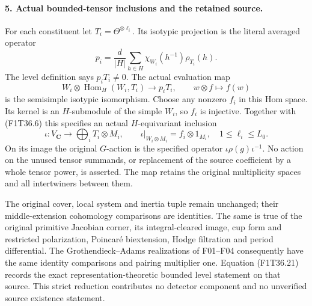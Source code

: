 \paragraph{5. Actual bounded-tensor inclusions and the retained source.}
For each constituent let
\(T_i=\Theta^{\otimes\ell_i}\).
Its isotypic projection is the literal
averaged operator
\[
 p_i=\frac d{|H|}\sum_{h\in H}
                    \chi_{W_i}(h^{-1})\rho_{T_i}(h).
 \tag{F1T36.19}
\]
The level definition says \(p_iT_i\ne0\).
The actual evaluation map
\[
 W_i\otimes\operatorname{Hom}_H(W_i,T_i)
                       \longrightarrow p_iT_i,
                    \qquad w\otimes f\longmapsto f(w)
 \tag{F1T36.20}
\]
is the semisimple isotypic isomorphism.
Choose any nonzero \(f_i\) in this Hom space.
Its kernel is an \(H\)-submodule of the
simple \(W_i\), so \(f_i\) is injective.
Together with (F1T36.6) this specifies an
actual \(H\)-equivariant inclusion
\[
 \iota:V_{\mathbf C}\longrightarrow
       \bigoplus_i T_i\otimes M_i,
 \qquad
 \iota|_{W_i\otimes M_i}=f_i\otimes1_{M_i},
 \quad 1\le\ell_i\le L_0.
 \tag{F1T36.21}
\]
On its image the original \(G\)-action is
the specified operator
\(\iota\rho(g)\iota^{-1}\). No action on
the unused tensor summands, or replacement
of the source coefficient by a whole tensor
power, is asserted. The map retains the
original multiplicity spaces and all
intertwiners between them.

The original cover, local system and inertia
tuple remain unchanged; their middle-extension
cohomology comparisons are identities.
The same is true of the original primitive
Jacobian corner, its integral-cleared image,
cup form and restricted polarization,
Poincar\'e biextension, Hodge filtration and
period differential. The Grothendieck--Adams
realizations of F01--F04 consequently have
the same identity comparisons and pairing
multiplier one. Equation (F1T36.21) records
the exact representation-theoretic bounded
level statement on that source. This strict
reduction contributes no detector component
and no unverified source existence statement.
